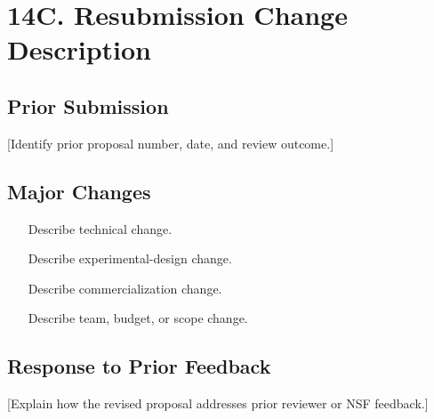 \documentclass[11pt,letterpaper]{article}
\begin{document}
\section*{14C. Resubmission Change Description}


\subsection*{Prior Submission}
[Identify prior proposal number, date, and review outcome.]

\subsection*{Major Changes}
\begin{enumerate}
\item [Describe technical change.]
\item [Describe experimental-design change.]
\item [Describe commercialization change.]
\item [Describe team, budget, or scope change.]
\end{enumerate}

\subsection*{Response to Prior Feedback}
[Explain how the revised proposal addresses prior reviewer or NSF feedback.]
\end{document}
